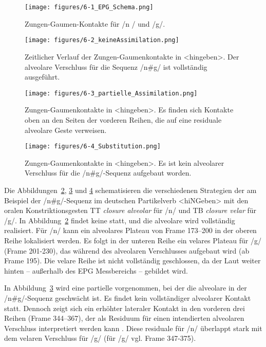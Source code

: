 \begin{figure}
	\texttt{[image: figures/6-1\_EPG\_Schema.png]}
	\caption{Zungen-Gaumen-Kontakte für /n / und /g/.}
	\label{figure:0601}
\end{figure}



\begin{figure}[p]
	\texttt{[image: figures/6-2\_keineAssimilation.png]}
	\caption{Zeitlicher Verlauf der Zungen-Gaumenkontakte in <hingeben>. Der alveolare Verschluss für die Sequenz /n\#g/ ist vollständig ausgeführt.}
	\label{figure:0602}
\end{figure}


\begin{figure}[p]
	\texttt{[image: figures/6-3\_partielle\_Assimilation.png]}
	\caption{Zungen-Gaumenkontakte in <hingeben>. Es finden sich Kontakte oben an den Seiten der vorderen Reihen, die auf eine residuale alveolare Geste verweisen.}
	\label{figure:0603}
\end{figure}

\begin{figure}[t]
	\texttt{[image: figures/6-4\_Substitution.png]}
	\caption{Zungen-Gaumenkontakte in <hingeben>. Es ist kein alveolarer Verschluss für die /n\#g/-Sequenz aufgebaut worden.}
	\label{figure:0604}
\end{figure}

Die Abbildungen~\ref{figure:0602}, \ref{figure:0603} und \ref{figure:0604} schematisieren die verschiedenen Strategien der  am Beispiel der /n\#g/-Sequenz im deutschen Partikelverb <hiNGeben> mit den oralen Konstriktionsgesten {TT \textit{closure alveolar}} für /n/ und {TB \textit{closure velar}} für /g/. In Abbildung~\ref{figure:0602} findet keine  statt, und die alveolare  wird vollständig realisiert. Für /n/ kann ein alveolares Plateau von Frame 173--200 in der oberen Reihe lokalisiert werden. Es folgt in der unteren Reihe ein velares Plateau für /g/ (Frame 201-230), das während des alveolaren Verschlusses aufgebaut wird (ab Frame 195). Die velare Reihe ist nicht vollständig geschlossen, da der Laut weiter hinten -- außerhalb des EPG Messbereichs -- gebildet wird.



In Abbildung~\ref{figure:0603} wird eine partielle  vorgenommen, bei der die alveolare  in der /n\#g/-Sequenz geschwächt ist. Es findet kein vollständiger alveolarer Kontakt statt. Dennoch zeigt sich ein erhöhter lateraler Kontakt in den vorderen drei Reihen (Frame 344--367), der als Residuum für einen intendierten alveolaren Verschluss interpretiert werden kann \citep[][381]{Ellis2002}. Diese residuale  für /n/ überlappt stark mit dem velaren Verschluss für /g/ (für /g/ vgl. Frame 347-375).


